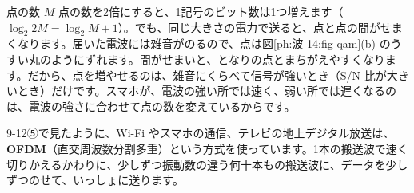 \begin{phbaisuru}{点の数 $M$}
点の数を2倍にすると、1記号のビット数は1つ増えます（$\log_2 2M=\log_2M+1$）。でも、同じ大きさの電力で送ると、点と点の間がせまくなります。届いた電波には雑音がのるので、点は図\ref{ph:波-14:fig-qam}(b) のうすい丸のようにずれます。間がせまいと、となりの点とまちがえやすくなります。だから、点を増やせるのは、雑音にくらべて信号が強いとき（S/N 比が大きいとき）だけです。スマホが、電波の強い所では速く、弱い所では遅くなるのは、電波の強さに合わせて点の数を変えているからです。
\end{phbaisuru}

\leavevmode\label{ph:波-14:sec4}9-12⑤で見たように、Wi-Fi やスマホの通信、テレビの地上デジタル放送は、\textbf{OFDM}（直交周波数分割多重）という方式を使っています。1本の搬送波で速く切りかえるかわりに、少しずつ振動数の違う何十本もの搬送波に、データを少しずつのせて、いっしょに送ります。

